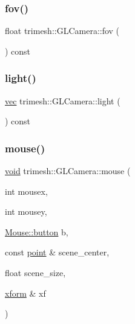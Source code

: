 \mbox{\label{classtrimesh_1_1GLCamera_a66b0728bd1477ce920bf0e1ed8f15a65}} 
\subsubsection{\texorpdfstring{fov()}{fov()}}
{\footnotesize\ttfamily float trimesh\+::\+G\+L\+Camera\+::fov (\begin{DoxyParamCaption}{ }\end{DoxyParamCaption}) const\hspace{0.3cm}{\ttfamily [inline]}}

\mbox{\label{classtrimesh_1_1GLCamera_a454fa2c37f61c0b8e204e72d7615d1f1}} 
\subsubsection{\texorpdfstring{light()}{light()}}
{\footnotesize\ttfamily \hyperlink{namespacetrimesh_a4fc2b83feba99c931f837a0c7d4b4df1}{vec} trimesh\+::\+G\+L\+Camera\+::light (\begin{DoxyParamCaption}{ }\end{DoxyParamCaption}) const\hspace{0.3cm}{\ttfamily [inline]}}

\mbox{\label{classtrimesh_1_1GLCamera_ab300421205b8c4f699ed09ff4124e32f}} 
\subsubsection{\texorpdfstring{mouse()}{mouse()}}
{\footnotesize\ttfamily \hyperlink{namespacetrimesh_a784ddfd979e1c579bda795a8edfc3f43}{void} trimesh\+::\+G\+L\+Camera\+::mouse (\begin{DoxyParamCaption}\item[{int}]{mousex,  }\item[{int}]{mousey,  }\item[{\hyperlink{namespacetrimesh_1_1Mouse_a0b9f7f2e8a91299850fa63a8c995b02a}{Mouse\+::button}}]{b,  }\item[{const \hyperlink{namespacetrimesh_a325b99fd6454b22fa4c4bc3223271b2c}{point} \&}]{scene\+\_\+center,  }\item[{float}]{scene\+\_\+size,  }\item[{\hyperlink{namespacetrimesh_ad504958f2f56e393991b848986a8459f}{xform} \&}]{xf }\end{DoxyParamCaption})}

